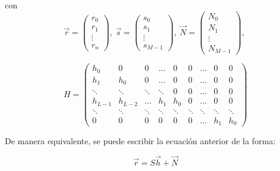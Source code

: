 \documentclass[a4paper]{article}
\begin{document}
 	 	con
 	 	\[ \vec{r} =  
 	 		\left( \begin{array}{l}
				r_{0}              \\
				r_{1}              \\
				\vdots 				\\
				r_{n}             
			\end{array} \right)
		,\
 	 	\vec{s} =  
 	 		\left( \begin{array}{l}
				s_{0}              \\
				s_{1}              \\
				\vdots 				\\
				s_{M-1}             
			\end{array} \right)
 	 	,\
 	 	\vec{N} =  
 	 		\left( \begin{array}{l}
				N_{0}              \\
				N_{1}              \\
				\vdots 				\\
				N_{M-1}             
			\end{array} \right)
		,\
 	 	\]
 	 	\par
		\[
		H = 	 	
	 		\left( \begin{array}{lllllllll}
				h_{0}   & 0       & 0       & \hdots  & 0       & 0       & \hdots  & 0       & 0       \\
				h_{1}   & h_{0}   & 0       & \hdots  & 0       & 0       & \hdots  & 0       & 0       \\
				\ddots & \ddots & \ddots & \ddots & 0       & 0       & \hdots  & 0       & 0       \\
				h_{L-1} & h_{L-2} & \hdots   & h_{1}   & h_{0}   & 0	& \hdots  & 0       & 0       \\
				\ddots & \ddots & \ddots & \ddots & \ddots & \ddots & \ddots & \ddots & \ddots \\
				0       & 0       & 0       & 0       & 0       & 0       & \hdots  & h_{1}   & h_{0}  
			\end{array} \right)
		\]
	 	  
		De manera equivalente, se puede escribir la ecuación anterior de la forma:\par
 	 	\begin{equation}
 	 		\vec{r} = S\vec{h} + \vec{N}
 	 		\label{eq:aestimar}
 	 	\end{equation}	\par
 	 	
\end{document}
